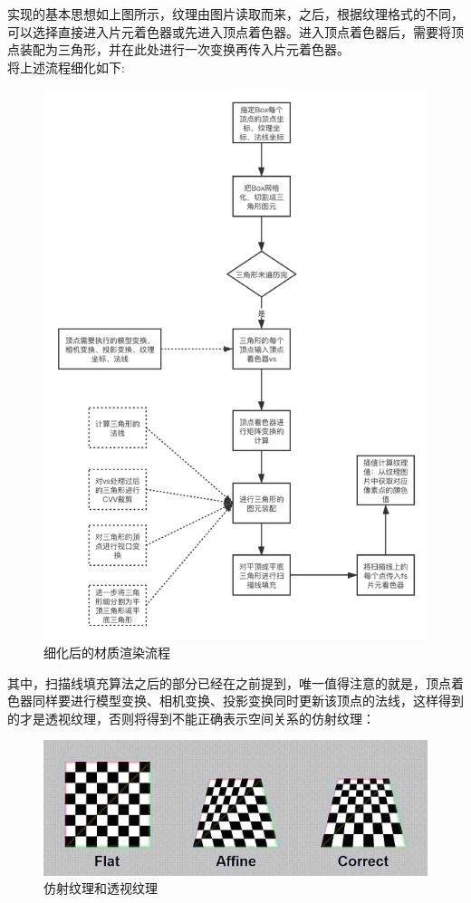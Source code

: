 \begin{spacing}{2.5}
    实现的基本思想如上图所示，纹理由图片读取而来，之后，根据纹理格式的不同，可以选择直接进入片元着色器或先进入顶点着色器。进入顶点着色器后，需要将顶点装配为三角形，并在此处进行一次变换再传入片元着色器。\\
    将上述流程细化如下:
    \begin{figure}[H]
    	\centering
		\includegraphics[width=1.0\textwidth]{images/texture_sequence.png}
		\caption{细化后的材质渲染流程}
		\label{texture_sequence}
    \end{figure}
    
    其中，扫描线填充算法之后的部分已经在之前提到，唯一值得注意的就是，顶点着色器同样要进行模型变换、相机变换、投影变换同时更新该顶点的法线，这样得到的才是透视纹理，否则将得到不能正确表示空间关系的仿射纹理：
    
     \begin{figure}[H]
    	\centering
		\includegraphics[width=1.0\textwidth]{images/wrong_example.jpg}
		\caption{仿射纹理和透视纹理}
		\label{wrong_example}
    \end{figure}
    

\end{spacing}
